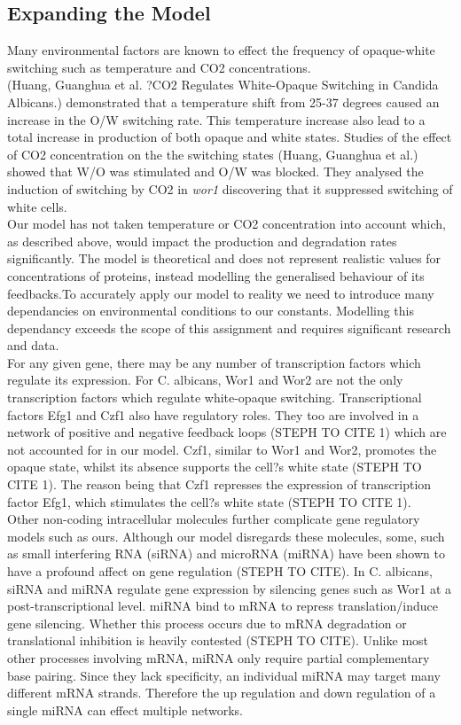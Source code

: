 \documentclass[]{article}
\begin{document}
\subsection{Expanding the Model}

Many environmental factors are known to effect the frequency of opaque-white switching such as temperature and CO2 concentrations. 
\\
(Huang, Guanghua et al. ?CO2 Regulates White-Opaque Switching in Candida Albicans.) demonstrated that a temperature shift from 25-37 degrees caused an increase in the O/W switching rate. This temperature increase also lead to a total increase in production of both opaque and white states.
Studies of the effect of CO2 concentration on the the switching states (Huang, Guanghua et al.) showed that W/O was stimulated and O/W was blocked. They analysed the induction of switching by CO2 in \textit{wor1} discovering that it suppressed switching of white cells.
\\
Our model has not taken temperature or CO2 concentration into account which, as described above, would impact the production and degradation rates significantly. The model is theoretical and does not represent realistic values for concentrations of proteins, instead modelling the generalised behaviour of its feedbacks.To accurately apply our model to reality we need to introduce many dependancies on environmental conditions to our constants. Modelling this dependancy exceeds the scope of this assignment and requires significant research and data.
\\
For any given gene, there may be any number of transcription factors which regulate its expression. For C. albicans, Wor1 and Wor2 are not the only transcription factors which regulate white-opaque switching. Transcriptional factors Efg1 and Czf1 also have regulatory roles. They too are involved in a network of positive and negative feedback loops (STEPH TO CITE 1) which are not accounted for in our model. Czf1, similar to Wor1 and Wor2, promotes the opaque state, whilst its absence supports the cell?s white state (STEPH TO CITE 1). The reason being that Czf1 represses the expression of transcription factor Efg1, which stimulates the cell?s white state (STEPH TO CITE 1).
\\
Other non-coding intracellular molecules further complicate gene regulatory models such as ours. Although our model disregards these molecules, some, such as small interfering RNA (siRNA) and microRNA (miRNA) have been shown to have a profound affect on gene regulation (STEPH TO CITE). In C. albicans,  siRNA and miRNA regulate gene expression by silencing genes such as Wor1 at a post-transcriptional level. miRNA bind to mRNA to repress translation/induce gene silencing. Whether this process occurs due to mRNA degradation or translational inhibition is heavily contested (STEPH TO CITE). Unlike most other processes involving mRNA, miRNA only require partial complementary base pairing. Since they lack specificity, an individual miRNA may target many different mRNA strands. Therefore the up regulation and down regulation of a single miRNA can effect multiple networks.
\end{document}
